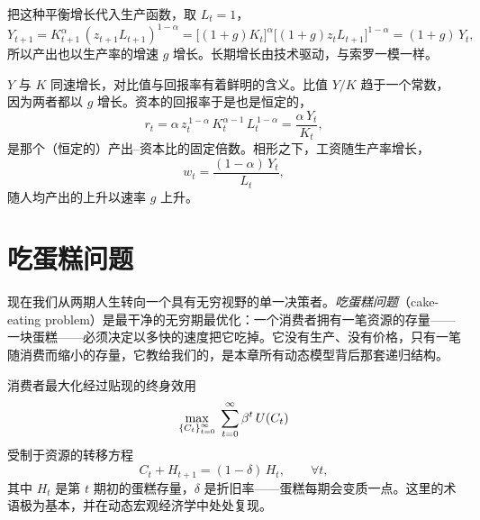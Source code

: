 把这种平衡增长代入生产函数，取 $L_t = 1$，
\[
Y_{t+1} = K_{t+1}^{\alpha}\,(z_{t+1} L_{t+1})^{1-\alpha}
        = \big[(1+g)K_t\big]^{\alpha}\big[(1+g)z_t L_{t+1}\big]^{1-\alpha}
        = (1+g)\, Y_t,
\]
所以产出也以生产率的增速 $g$ 增长。长期增长由技术驱动，与索罗一模一样。

$Y$ 与 $K$ 同速增长，对比值与回报率有着鲜明的含义。比值 $Y/K$ 趋于一个常数，因为两者都以 $g$ 增长。资本的回报率于是也是恒定的，
\[
r_t = \alpha\, z_t^{\,1-\alpha}\, K_t^{\alpha-1}\, L_t^{\,1-\alpha} = \frac{\alpha\, Y_t}{K_t},
\]
是那个（恒定的）产出--资本比的固定倍数。相形之下，工资随生产率增长，
\[
w_t = \frac{(1-\alpha)\,Y_t}{L_t},
\]
随人均产出的上升以速率 $g$ 上升。


\section{吃蛋糕问题}

现在我们从两期人生转向一个具有无穷视野的单一决策者。\emph{吃蛋糕问题}（cake-eating problem）是最干净的无穷期最优化：一个消费者拥有一笔资源的存量——一块蛋糕——必须决定以多快的速度把它吃掉。它没有生产、没有价格，只有一笔随消费而缩小的存量，它教给我们的，是本章所有动态模型背后那套递归结构。

消费者最大化经过贴现的终身效用
\[
\max_{\left\{C_t\right\}_{t=0}^{\infty}}\; \sum_{t=0}^{\infty} \beta^t\, U(C_t)
\]
受制于资源的转移方程
\[
C_t + H_{t+1} = (1-\delta)\, H_t, \qquad \forall t,
\]
其中 $H_t$ 是第 $t$ 期初的蛋糕存量，$\delta$ 是折旧率——蛋糕每期会变质一点。这里的术语极为基本，并在动态宏观经济学中处处复现。


